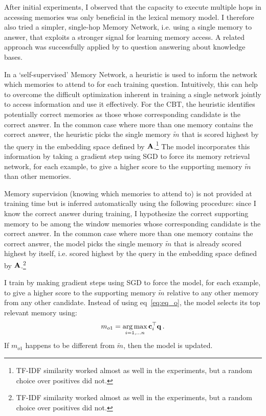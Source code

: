 After initial experiments, I observed that the capacity to execute multiple hops in accessing memories was only beneficial in the lexical memory model. I therefore also tried a simpler, single-hop Memory Network, i.e. using a single memory to answer, that exploits a stronger signal for learning memory access. A related approach was successfully applied by \cite{bordes2015large} to question answering about knowledge bases.

In a `self-supervised' Memory Network, a heuristic is used to inform the network which memories to attend to for each training question. Intuitively, this can help to overcome the difficult optimization inherent in training a single network jointly to access information and use it effectively. For the CBT, the heuristic identifies potentially correct memories as those whose corresponding candidate is the correct answer. In the common case where more than one memory contains the correct answer, the heuristic picks the single memory $\tilde{m}$ that is scored highest by the query in the embedding space defined by ${\bf A}$.\footnote{TF-IDF similarity worked almost as well in the experiments, but a random choice over positives did not.} The model incorporates this information by taking a gradient step using SGD to force its memory retrieval network, for each example, to give a higher score to the supporting memory $\tilde{m}$ than other memories.
\fi

		
Memory supervision (knowing which memories to attend to) is not provided at training time but is inferred automatically using the following procedure: since I know the correct answer during training, I hypothesize the correct supporting memory to be among the window memories whose corresponding candidate is the correct answer.		
%		
In the common case where more than one memory contains the correct answer, the model picks the single memory  $\tilde{m}$ that is already scored highest by itself, i.e. scored highest by the query in the embedding space defined by ${\bf A}$.\footnote{TF-IDF similarity worked almost as well in the experiments, but a random choice over positives did not.} 

I train by making gradient steps using SGD to force the model, for each example, to give a higher score to the supporting memory $\tilde{m}$ relative to any other memory from any other candidate.
%
Instead of using  eq~\eqref{eq:eq_o}, the model selects its top relevant memory using:
\begin{equation} \label{eq:salient}
  m_{o1} = \argmax_{i=1,\dots n} \bc_i^\top\bq \, .%
\end{equation}
%
If $m_{o1}$ happens to be different from $\tilde{m}$, then the model is updated.


